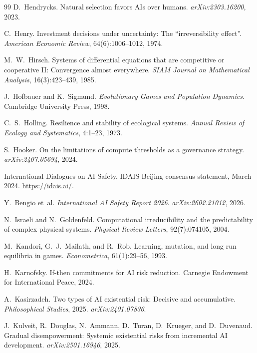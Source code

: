 \documentclass[11pt]{article}
\theoremstyle{plain}
\theoremstyle{definition}
\begin{document}
\begin{thebibliography}{99}
 D.~Hendrycks. Natural selection favors AIs over humans. \emph{arXiv:2303.16200}, 2023.

 C.~Henry. Investment decisions under uncertainty: The ``irreversibility effect''. \emph{American Economic Review}, 64(6):1006--1012, 1974.

 M.~W.~Hirsch. Systems of differential equations that are competitive or cooperative II: Convergence almost everywhere. \emph{SIAM Journal on Mathematical Analysis}, 16(3):423--439, 1985.

 J.~Hofbauer and K.~Sigmund. \emph{Evolutionary Games and Population Dynamics}. Cambridge University Press, 1998.

 C.~S.~Holling. Resilience and stability of ecological systems. \emph{Annual Review of Ecology and Systematics}, 4:1--23, 1973.

 S.~Hooker. On the limitations of compute thresholds as a governance strategy. \emph{arXiv:2407.05694}, 2024.

 International Dialogues on AI Safety. IDAIS-Beijing consensus statement, March 2024. \url{https://idais.ai/}.

 Y.~Bengio et~al. \emph{International AI Safety Report 2026}. \emph{arXiv:2602.21012}, 2026.

 N.~Israeli and N.~Goldenfeld. Computational irreducibility and the predictability of complex physical systems. \emph{Physical Review Letters}, 92(7):074105, 2004.

 M.~Kandori, G.~J.~Mailath, and R.~Rob. Learning, mutation, and long run equilibria in games. \emph{Econometrica}, 61(1):29--56, 1993.

 H.~Karnofsky. If-then commitments for AI risk reduction. Carnegie Endowment for International Peace, 2024.

 A.~Kasirzadeh. Two types of AI existential risk: Decisive and accumulative. \emph{Philosophical Studies}, 2025. \emph{arXiv:2401.07836}.

 J.~Kulveit, R.~Douglas, N.~Ammann, D.~Turan, D.~Krueger, and D.~Duvenaud. Gradual disempowerment: Systemic existential risks from incremental AI development. \emph{arXiv:2501.16946}, 2025.


\end{thebibliography}
\end{document}
